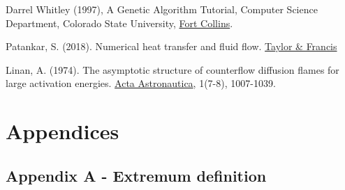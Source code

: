\documentclass[12pt]{article}
\numberwithin{equation}{section}
\begin{document}
\begin{flushleft}
\begin{thebibliography}{9}
 \label{noise}
Darrel Whitley (1997), A Genetic Algorithm Tutorial, Computer Science Department, Colorado State University, \href{https://web.archive.org/web/20130615042000/http://samizdat.mines.edu/ga_tutorial/ga_tutorial.ps}{Fort Collins}.


 \label{HT}
Patankar, S. (2018). Numerical heat transfer and fluid flow. \href{https://catatanstudi.files.wordpress.com/2010/02/numerical-heat-transfer-and-fluid-flow.pdf}{Taylor \& Francis}

 \label{linan}
Linan, A. (1974). The asymptotic structure of counterflow diffusion flames for large activation energies. \href{https://www.sciencedirect.com/science/article/abs/pii/0094576574900666}{Acta Astronautica}, 1(7-8), 1007-1039.


\end{thebibliography}
\newpage

\section*{Appendices} 

\subsection*{\hypertarget{app_extremum}{Appendix A} - Extremum definition} 


\end{flushleft}
\end{document}
